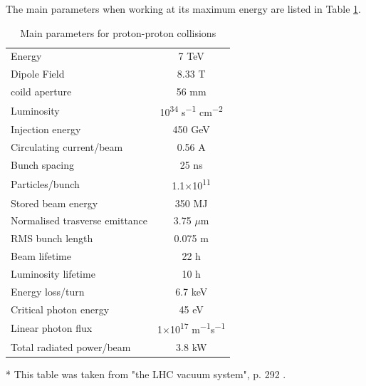 The main parameters when working at its maximum energy are listed in Table \ref{table:LHCparam}. 
\begin{table}%
\caption{Main parameters for proton-proton collisions} %
\begin{minipage}{\textwidth}
\renewcommand{\thefootnote}{\thempfootnote}

\begin{tabular}{l c}%
\hline
Energy \hspace{8.5cm} & 7 TeV \\ %
Dipole Field & 8.33 T \\
coild aperture & 56 mm \\
Luminosity &10\textsuperscript{34} s\textsuperscript{$-$1} cm\textsuperscript{$-$2} \\
Injection energy & 450 GeV \\
Circulating current/beam & 0.56 A\\
Bunch spacing & 25 ns \\
Particles/bunch & 1.1$\times$10\textsuperscript{11} \\
Stored beam energy & 350 MJ \\
Normalised trasverse emittance & 3.75 $\mu$m \\
RMS bunch length & 0.075 m \\
Beam lifetime & 22 h \\
Luminosity lifetime & 10 h \\
Energy loss/turn & 6.7 keV \\
Critical photon energy & 45 eV \\
Linear photon flux & 1$\times$10\textsuperscript{17} m\textsuperscript{$-$1}s\textsuperscript{$-$1} \\
Total radiated power/beam & 3.8 kW \\ [1ex] %
\hline
\end{tabular}
\end{minipage}
\begin{minipage}{\textwidth}
\begin{footnotesize}
* This table was taken from "the LHC vacuum system", p. 292 \citep{vacuum}.
\end{footnotesize}
\end{minipage}
\label{table:LHCparam} %
\end{table}

